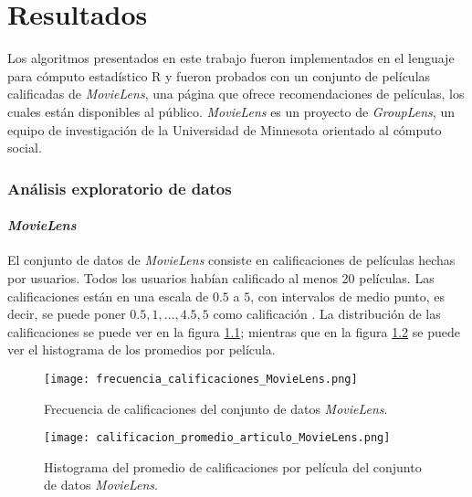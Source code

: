 
\chapter{Resultados}

Los algoritmos presentados en este trabajo fueron implementados en el lenguaje para cómputo estadístico R y fueron probados con un conjunto de películas calificadas de \textit{MovieLens}, una página que ofrece recomendaciones de películas, los cuales están disponibles al público. \textit{MovieLens} es un proyecto de \textit{GroupLens}, un equipo de investigación de la Universidad de Minnesota orientado al cómputo social.

\subsection{Análisis exploratorio de datos}

\subsubsection{\textit{MovieLens}}

El conjunto de datos de \textit{MovieLens} consiste en  calificaciones de  películas hechas por  usuarios. Todos los usuarios habían calificado al menos 20 películas. Las calificaciones están en una escala de $0.5$ a $5$, con intervalos de medio punto, es decir, se puede poner $0.5, 1, \hdots, 4.5, 5$ como calificación \cite{harper2016movielens}. La distribución de las calificaciones se puede ver en la figura \ref{fig:ML_frec_calificaciones}; mientras que en la figura \ref{fig:ML_hist_prom_cals} se puede ver el histograma de los promedios por película.

\begin{figure}
	\centering
 	\texttt{[image: frecuencia\_calificaciones\_MovieLens.png]}
 	\caption{Frecuencia de calificaciones del conjunto de datos \textit{MovieLens}.}
 	\label{fig:ML_frec_calificaciones}
\end{figure}

\begin{figure}
	\centering
 	\texttt{[image: calificacion\_promedio\_articulo\_MovieLens.png]}
 	\caption{Histograma del promedio de calificaciones por película del conjunto de datos \textit{MovieLens}.}
 	\label{fig:ML_hist_prom_cals}
\end{figure}

